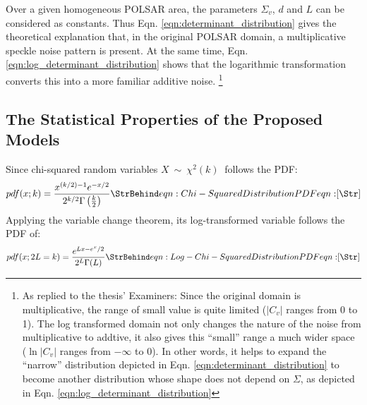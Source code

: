 Over a given homogeneous POLSAR area, the parameters $\Sigma_v$, $d$ and $L$ can be considered as constants.
Thus Eqn. \ref{eqn:determinant_distribution} gives the theoretical explanation that, 
  in the original POLSAR domain, a multiplicative speckle noise pattern is present.
At the same time, Eqn. \ref{eqn:log_determinant_distribution} shows that
  the logarithmic transformation converts this into a more familiar additive noise.
\footnote{
  As replied to the thesis' Examiners: Since the original domain is multiplicative, the range of small value is quite limited ($|C_v|$ ranges from 0 to 1).
  The log transformed domain not only changes the nature of the noise from multiplicative to addtive,
    it also gives this ``small'' range a much wider space ($\ln{|C_v|}$ ranges from $-\infty$ to 0).
  In other words, it helps to expand the ``narrow'' distribution depicted in Eqn. \ref{eqn:determinant_distribution} to become another distribution whose shape does not depend on $\Sigma$, as depicted in Eqn. \ref{eqn:log_determinant_distribution}
}  

\subsection{The Statistical Properties of the Proposed Models}  
  
Since chi-squared random variables $X\ \sim\ \chi^2(k)\ $ follows the PDF:
\begin{equation}
pdf(x;k) =
  \frac{x^{(k/2)-1} e^{-x/2}}{2^{k/2} \Gamma\left(\frac{k}{2}\right)}
\label{eqn:chi_squared_dist_pdf:chap4}
\caption{eqn:Chi-Squared Distribution PDF}
\end{equation}
Applying the variable change theorem, 
  its log-transformed variable follows the PDF of:
\begin{equation}
  pdf(x;2L=k) = \frac{e^{Lx-e^x/2}}{2^{L}\Gamma(L)}
\label{eqn:Log-Chi-Squared Distribution PDF}
\caption{eqn:Log-Chi-Squared Distribution PDF}
\end{equation}

